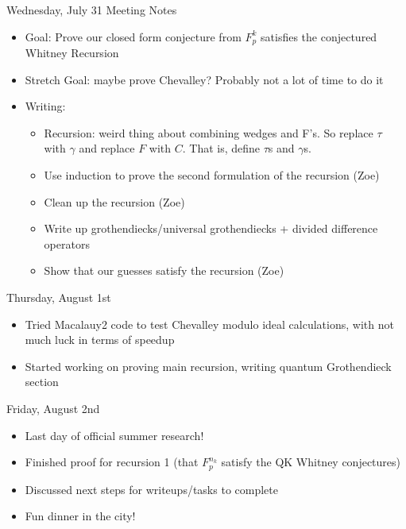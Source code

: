 Wednesday, July 31 Meeting Notes
\begin{itemize}
    \item Goal: Prove our closed form conjecture from $F_p^k$ satisfies the conjectured Whitney Recursion
    \item Stretch Goal: maybe prove Chevalley? Probably not a lot of time to do it
    \item Writing:
    \begin{itemize}
        \item Recursion: weird thing about combining wedges and F's. So replace $\tau$ with $\gamma$ and replace $F$ with $C$. That is, define $\tau$s and $\gamma$s.  
        \item Use induction to prove the second formulation of the recursion (Zoe)
        \item Clean up the recursion (Zoe)
        \item Write up grothendiecks/universal grothendiecks + divided difference operators
        \item Show that our guesses satisfy the recursion (Zoe)
    \end{itemize}
\end{itemize}

Thursday, August 1st
\begin{itemize}
    \item Tried Macalauy2 code to test Chevalley modulo ideal calculations, with not much luck in terms of speedup
    \item Started working on proving main recursion, writing quantum Grothendieck section
\end{itemize}

Friday, August 2nd
\begin{itemize}
    \item Last day of official summer research!
    \item Finished proof for recursion 1 (that $F_p^{n_k}$ satisfy the QK Whitney conjectures)
    \item Discussed next steps for writeups/tasks to complete
    \item Fun dinner in the city!
\end{itemize}